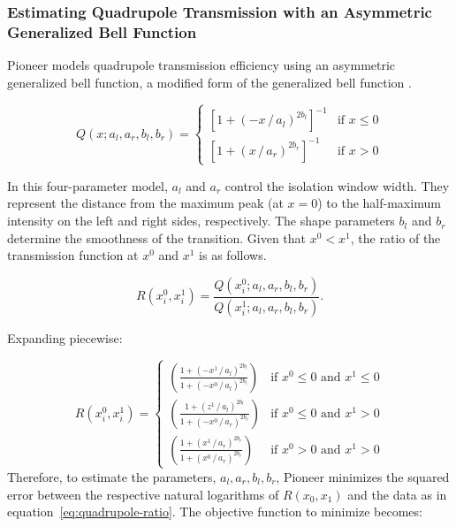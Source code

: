 \documentclass[pdflatex,sn-nature]{sn-jnl}
\begin{document}
\subsubsection{Estimating Quadrupole Transmission with an Asymmetric Generalized Bell Function}\label{subsubsec:asymmetric-generalized-bell-function}
Pioneer models quadrupole transmission efficiency using an asymmetric generalized bell function, a modified form of the generalized bell function \cite{Jang1993-ke}.

\begin{equation}
    Q(x; a_l, a_r, b_l, b_r) = \begin{cases}
    \left[1 + \left(-x \,/\, a_l\right)^{2b_l}\right]^{-1} & \text{if } x \leq 0 \\
    \left[1 + \left(x \,/\, a_r\right)^{2b_r}\right]^{-1} & \text{if } x > 0
    \end{cases}
\end{equation}

In this four-parameter model, $a_l$ and $a_r$ control the isolation window width. They represent the distance from the maximum peak (at $x=0$) to the half-maximum intensity on the left and right sides, respectively. The shape parameters $b_l$ and $b_r$ determine the smoothness of the transition. Given that $x^0 < x^1$, the ratio of the transmission function at $x^0$ and $x^1$ is as follows. 

\begin{equation}
R(x_i^0, x_i^1)
=
\frac{Q(x_i^0; a_l, a_r, b_l, b_r)}
     {Q(x_i^1; a_l, a_r, b_l, b_r)}.
\end{equation}

Expanding piecewise:

\begin{equation}
    R(x_i^0, x_i^1) =
    \begin{cases}
    \left(\frac{1 + \left(-x^1 \,/\, a_l \right)^{2b_l}}{1 + \left(-x^0 \,/\, a_l \right)^{2b_l}}\right) & \text{if } x^0 \leq 0 \text{ and } x^1 \leq 0 \\[1em]
    \left(\frac{1 + \left(z^1 \,/\, a_l \right)^{2b_l}}{1 + \left(-x^0 \,/\, a_r \right)^{2b_r}}\right) & \text{if } x^0 \leq 0 \text{ and } x^1 > 0 \\[1em]
    \left(\frac{1 + \left(x^1 \,/\, a_r \right)^{2b_r}}{1 + \left(x^0 \,/\, a_r \right)^{2b_r}}\right) & \text{if } x^0 > 0 \text{ and } x^1 > 0
    \end{cases}
\end{equation}
Therefore, to estimate the parameters, $ a_l, a_r, b_l, b_r$, Pioneer minimizes the squared error between the respective natural logarithms of $R(x_0, x_1)$ and the data as in equation~\eqref{eq:quadrupole-ratio}. The objective function to minimize becomes:
\end{document}
